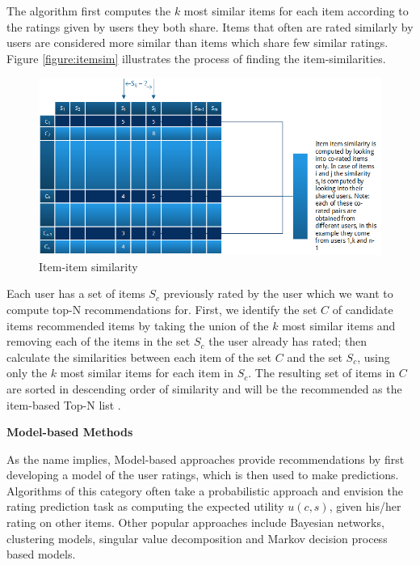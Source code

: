 The algorithm first computes the $k$ most similar items for each item according to the ratings given by users they both share. Items that often are rated similarly by users are considered more similar than items which share few similar ratings. Figure \ref{figure:itemsim} illustrates the process of finding the item-similarities.

\begin{figure}[H]
    \includegraphics[width=5in]{image/itemsim.png}
    \centering
    \caption[Item-item similarity]{Item-item similarity}
    \label{figure:ratingmatrix}
\end{figure}


Each user has a set of items $S_{c}$ previously rated by the user which we want to compute top-N recommendations for. First, we identify the set $C$ of candidate items recommended items by taking the union of the $k$ most similar items and removing each of the items in the set $S_{c}$ the user already has rated; then calculate the similarities between each item of the set $C$ and the set $S_{c}$, using only the $k$ most similar items for each item in $S_{c}$. The resulting set of items in $C$ are sorted in descending order of similarity and will be the recommended as the item-based Top-N list \cite{Karypis2001}.\linebreak[4]

\textbf{Model-based Methods}

As the name implies, Model-based approaches provide recommendations by first developing a model of the user ratings, which is then used to make predictions. Algorithms of this category often take a probabilistic approach and envision the rating prediction task as computing the expected utility $u(c,s)$, given his/her rating on other items. Other popular approaches include Bayesian networks, clustering models, singular value decomposition and Markov decision process based models.

